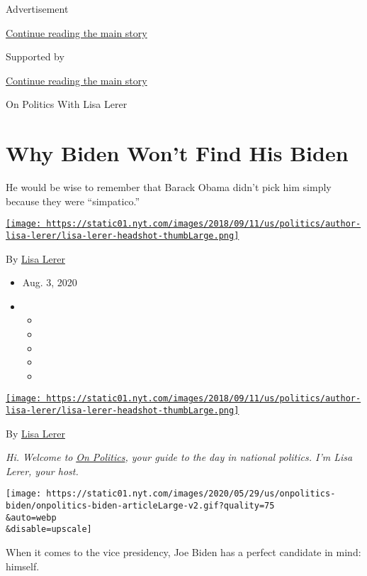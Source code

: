 Advertisement

\protect\hyperlink{after-top}{Continue reading the main story}

Supported by

\protect\hyperlink{after-sponsor}{Continue reading the main story}

On Politics With Lisa Lerer

\hypertarget{why-biden-wont-find-his-biden}{%
\section{Why Biden Won't Find His
Biden}\label{why-biden-wont-find-his-biden}}

He would be wise to remember that Barack Obama didn't pick him simply
because they were ``simpatico.''

\href{https://www.nytimes.com/by/lisa-lerer}{\texttt{[image: https://static01.nyt.com/images/2018/09/11/us/politics/author-lisa-lerer/lisa-lerer-headshot-thumbLarge.png]}}

By \href{https://www.nytimes.com/by/lisa-lerer}{Lisa Lerer}

\begin{itemize}
\item
  Aug. 3, 2020
\item
  \begin{itemize}
  \item
  \item
  \item
  \item
  \item
  \end{itemize}
\end{itemize}

\href{https://www.nytimes.com/by/lisa-lerer}{\texttt{[image: https://static01.nyt.com/images/2018/09/11/us/politics/author-lisa-lerer/lisa-lerer-headshot-thumbLarge.png]}}

By \href{https://www.nytimes.com/by/lisa-lerer}{Lisa Lerer}

\emph{Hi. Welcome to}
\href{https://www.nytimes.com/spotlight/on-politics}{\emph{On
Politics}}\emph{, your guide to the day in national politics. I'm Lisa
Lerer, your host.}

\texttt{[image: https://static01.nyt.com/images/2020/05/29/us/onpolitics-biden/onpolitics-biden-articleLarge-v2.gif?quality=75\\\&auto=webp\\\&disable=upscale]}

When it comes to the vice presidency, Joe Biden has a perfect candidate
in mind: himself.


